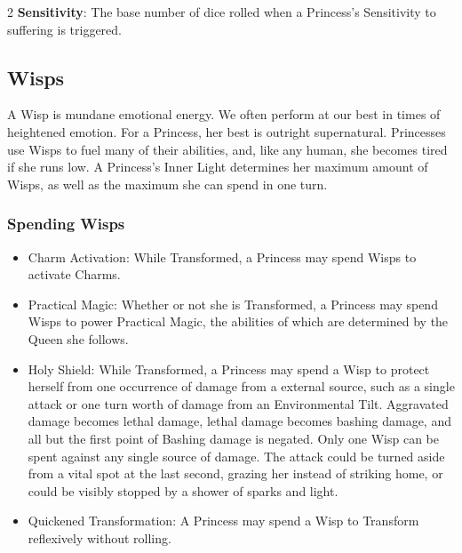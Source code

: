 \begin{multicols}{2}
\noindent \textbf{Sensitivity}: The base number of dice rolled when a Princess's Sensitivity to suffering is triggered. \\

\subsection*{Wisps}
\label{subsec:Wisps} 

A Wisp is mundane emotional energy. We often perform at our best in times of heightened emotion. For a Princess, her best is outright supernatural. Princesses use Wisps to fuel many of their abilities, and, like any human, she becomes tired if she runs low. A Princess's Inner Light determines her maximum amount of Wisps, as well as the maximum she can spend in one turn. 

\subsubsection*{Spending Wisps}
\begin{itemize}
\item    Charm Activation: While Transformed, a Princess may spend Wisps to activate Charms.
\item    Practical Magic: Whether or not she is Transformed, a Princess may spend Wisps to power Practical Magic, the abilities of which are determined by the Queen she follows.
\item    Holy Shield: While Transformed, a Princess may spend a Wisp to protect herself from one occurrence of damage from a external source, such as a single attack or one turn worth of damage from an Environmental Tilt. Aggravated damage becomes lethal damage, lethal damage becomes bashing damage, and all but the first point of Bashing damage is negated. Only one Wisp can be spent against any single source of damage. The attack could be turned aside from a vital spot at the last second, grazing her instead of striking home, or could be visibly stopped by a shower of sparks and light.
\item    Quickened Transformation: A Princess may spend a Wisp to Transform reflexively without rolling. 
\end{itemize}


\end{multicols}
